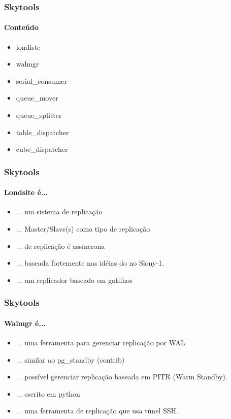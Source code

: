 \documentclass{beamer}
\begin{document}
\begin{frame}
    \frametitle{\textbf{Skytools}}
    \framesubtitle{Conteúdo}
      \begin{itemize}
      \item londiste 
      \item walmgr 
      \item serial\_consumer
      \item queue\_mover 
      \item queue\_splitter
      \item table\_dispatcher
      \item cube\_dispatcher
      \end{itemize}
\end{frame}


\begin{frame}
    \frametitle{\textbf{Skytools}}
    \framesubtitle{Londsite é...}
      \begin{itemize}
        \item ... um sistema de replicação
        \item ... Master/Slave(s) como tipo de replicação
        \item ... de replicação é assíncrona
        \item ... baseada fortemente nas idéias do no Slony-1.
        \item ... um replicador baseado em gatilhos
      \end{itemize}


\end{frame}

\begin{frame}
    \frametitle{\textbf{Skytools}}
    \framesubtitle{Walmgr é...}
      \begin{itemize}
        \item ... uma ferramenta para gerenciar replicação por WAL
        \item ... similar ao pg\_standby (contrib)
        \item ... possível gerenciar replicação baseada em PITR (Warm Standby).
        \item ... escrito em python
        \item ... uma ferramenta de replicação que usa túnel SSH.
      \end{itemize}
\end{frame}
\end{document}
